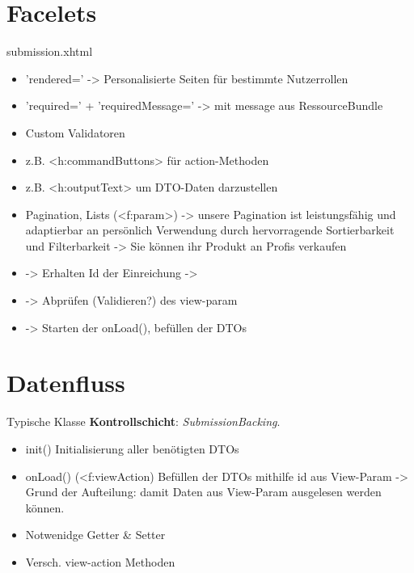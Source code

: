 \documentclass{beamer}
\begin{document}
    \section{Facelets}
    \begin{frame}{submission.xhtml}
        \begin{itemize}
            \item 'rendered='
            -> Personalisierte Seiten für bestimmte Nutzerrollen
            \item 'required=' + 'requiredMessage='
            -> mit message aus RessourceBundle %
            \item Custom Validatoren %
            \item z.B. <h:commandButtons> für action-Methoden
            \item z.B. <h:outputText> um DTO-Daten darzustellen
            \item Pagination, Lists (<f:param>) %
            -> unsere Pagination ist leistungsfähig und adaptierbar an persönlich Verwendung
            durch hervorragende Sortierbarkeit und Filterbarkeit
            -> Sie können ihr Produkt an Profis verkaufen
            \item <f:viewParam>
            -> Erhalten Id der Einreichung
            -> %
            \item <f:event>
            -> Abprüfen (Validieren?) des view-param
            \item <f:viewAction>
            -> Starten der onLoad(), befüllen der DTOs
        \end{itemize}
    \end{frame}


    \section{Datenfluss}

    \begin{frame}{Typische Klasse \textbf{Kontrollschicht}:}
        \emph{SubmissionBacking}.
        \pause
        \begin{itemize}
            \item init()
            Initialisierung aller benötigten DTOs
            \item onLoad() (<f:viewAction)
            Befüllen der DTOs mithilfe id aus View-Param
            -> Grund der Aufteilung: damit Daten aus View-Param ausgelesen werden können.
            \item Notwenidge Getter & Setter %
            \item Versch. view-action Methoden
        \end{itemize}
    \end{frame}
\end{document}
